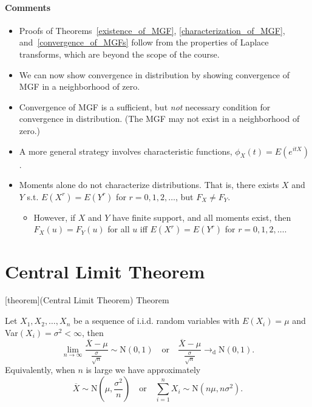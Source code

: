 \documentclass[12pt]{report}
\theoremstyle{definition}
\begin{document}
\paragraph{Comments}
\begin{itemize}
    \item Proofs of Theorems~\ref{existence_of_MGF},
        \ref{characterization_of_MGF}, and~\ref{convergence_of_MGFs} follow from
        the properties of Laplace transforms, which are beyond the scope of the
        course.
    \item We can now show convergence in distribution by showing convergence of
        MGF in a neighborhood of zero.
    \item Convergence of MGF is a sufficient, but \emph{not} necessary condition
        for convergence in distribution. (The MGF may not exist in a
        neighborhood of zero.)
    \item A more general strategy involves characteristic functions,
        $\phi_X(t)=E\left(e^{itX}\right)$.
    \item Moments alone do not characterize distributions. That is, there exists
        $X$ and $Y$ s.t. $E(X^{r})=E(Y^r)$ for $r=0,1,2,\ldots$, but $F_X\neq
        F_Y$. 
        \begin{itemize}
            \item 
                However, if $X$ and $Y$ have finite support, and all moments
                exist, then $F_X(u)=F_Y(u)$ for all $u$ iff $E(X^r)=E(Y^r)$ for
                $r=0,1,2,\ldots$.
        \end{itemize} 
\end{itemize} 

\section{Central Limit Theorem}

[theorem]{(Central Limit Theorem) Theorem}
\begin{CLT}
    Let $X_1,X_2,\ldots,X_n$ be a sequence of i.i.d. random variables with
    $E(X_i)=\mu$ and Var$(X_i)=\sigma^2<\infty$, then
    \[
        \lim_{n\rightarrow\infty}\frac{\overline{X}-\mu}{\frac{\sigma}{\sqrt{n}}}
        \sim\text{N}(0,1)\quad\text{or}\quad
        \frac{\overline{X}-\mu}{\frac{\sigma}{\sqrt{n}}}\rightarrow_\text{d}\text{N}(0,1).
    \]
    Equivalently, when $n$ is large we have approximately
    \[
        \overline{X}\sim\text{N}\left(\mu,\frac{\sigma^{2}}{n}\right)
        \quad\text{or}\quad
        \sum_{i=1}^{n} X_i \sim \text{N}(n\mu,n\sigma^{2}).
    \]
\end{CLT}
\end{document}
